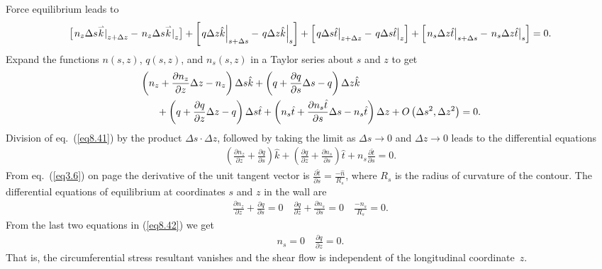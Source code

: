 \documentclass{AeroStructure-ERJohnson}
\def\harp#1{\smash{\mathord{\buildrel{\lower3pt\hbox{$\scriptscriptstyle\rightharpoonup$}}\over{#1}}}}
\begin{document}
\noindent Force equilibrium leads to
\begin{align}\label{eq8.40}
\left[\left.n_{z} \Delta s \harp{k}\right|_{z+\Delta z}-\left.n_{z}
\Delta s \harp{k}\right|_{z}\right]+\left[\left.q \Delta z
\hat{k}\right|_{s+\Delta s}-\left.q \Delta z
\hat{k}\right|_{s}\right]+\left[\left.q \Delta s
\hat{t}\right|_{z+\Delta z}-\left.q \Delta s
\hat{t}\right|_{z}\right]+\left[\left.n_{s} \Delta z
\hat{t}\right|_{s+\Delta s}-\left.n_{s} \Delta z
\hat{t}\right|_{s}\right]=0.
\end{align}
Expand the functions $n(s,z)$, $q(s,z)$, and $n_s(s,z)$ in a
Taylor series about $s$ and $z$ to get
\begin{align}
&\left(n_{z}+\frac{\partial n_{z}}{\partial z} \Delta
z-n_{z}\right) \Delta s \hat{k}+\left(q+\frac{\partial q}{\partial
s} \Delta s-q\right) \Delta z \hat{k} \nonumber\\
&\hspace*{-3pt}\qquad+\left(q+\frac{\partial
q}{\partial z} \Delta z-q\right) \Delta s \hat{t}+\left(n_{s}
\hat{t}+\frac{\partial n_{s} \hat{t}}{\partial s} \Delta s-n_{s}
\hat{t}\right) \Delta z+O\left(\Delta s^{2}, \Delta
z^{2}\right)=0. \label{eq8.41}
\end{align}
Division of eq.~(\ref{eq8.41}) by the product $\Delta s \cdot
\Delta z$, followed by taking the limit as $\Delta s \rightarrow
0$ and $\Delta z \rightarrow 0$ leads to the differential
equations
\begin{align*}
\left(\frac{\partial n_{z}}{\partial z}+\frac{\partial q}{\partial
s}\right) \hat{k}+\left(\frac{\partial q}{\partial
z}+\frac{\partial n_{s}}{\partial s}\right) \hat{t}+n_{s}
\frac{\partial \hat{t}}{\partial s}=0.
\end{align*}
From eq.~(\ref{eq3.6}) on page \pageref{eq3.6} the derivative of the unit
tangent vector is $\frac{\partial \hat{t}}{\partial
s}=\frac{-\hat{n}}{R_{s}}$, where $R_s$ is the radius of curvature
of the contour. The differential equations of equilibrium at
coordinates $s$ and $z$ in the wall are
\begin{align}\label{eq8.42}
\frac{\partial n_{z}}{\partial z}+\frac{\partial q}{\partial s}=0
\quad \frac{\partial q}{\partial z}+\frac{\partial n_{s}}{\partial
s}=0 \quad \frac{-n_{s}}{R_{s}}=0.
\end{align}
From the last two equations in (\ref{eq8.42}) we get
\begin{align}\label{eq8.43}
n_{s}=0 \quad \frac{\partial q}{\partial z}=0.
\end{align}
That is, the circumferential stress resultant vanishes and the
shear flow is independent of the longitudinal coordinate~$z$.
\end{document}
